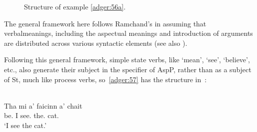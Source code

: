 \documentclass[output=paper]{langsci/langscibook}
\begin{document}
\begin{figure}
\caption{Structure of example \eqref{adger:56a}.\label{ag-tree}}
\end{figure}

The general framework here follows Ramchand's in assuming that verbal\linebreak meanings,
including the aspectual meanings and introduction of arguments are distributed
across various syntactic elements (see also \citealt{Borer2005}).

Following this general framework, simple state verbs, like `mean', `see', `believe', etc., also generate their
subject in the specifier of AspP, rather than as a subject of St, much like
process verbs, so~\eqref{adger:57} has the structure in~:

\ea {}\label{adger:57}\\
\gll Tha mi a' faicinn a' chait\\
be.\Prs{} I \Simp{} see.\Vn{} the.\Gen{} cat.\Gen{}\\
\glt \enquote*{I see the cat.}
\z
\end{document}
